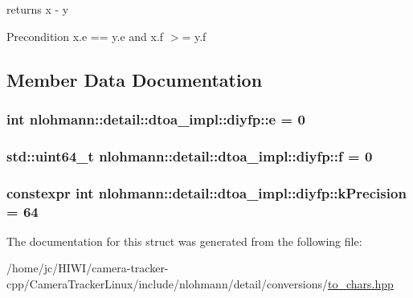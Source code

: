 returns x -\/ y 

\begin{DoxyPrecond}{Precondition}
x.\+e == y.\+e and x.\+f $>$= y.\+f 
\end{DoxyPrecond}


\subsection{Member Data Documentation}
\subsubsection[{\texorpdfstring{e}{e}}]{\setlength{\rightskip}{0pt plus 5cm}int nlohmann\+::detail\+::dtoa\+\_\+impl\+::diyfp\+::e = 0}\hypertarget{structnlohmann_1_1detail_1_1dtoa__impl_1_1diyfp_ae22e170815983961447c429f324c944d}{}\label{structnlohmann_1_1detail_1_1dtoa__impl_1_1diyfp_ae22e170815983961447c429f324c944d}
\subsubsection[{\texorpdfstring{f}{f}}]{\setlength{\rightskip}{0pt plus 5cm}std\+::uint64\+\_\+t nlohmann\+::detail\+::dtoa\+\_\+impl\+::diyfp\+::f = 0}\hypertarget{structnlohmann_1_1detail_1_1dtoa__impl_1_1diyfp_aea90459e340a231ca31d46946803ef51}{}\label{structnlohmann_1_1detail_1_1dtoa__impl_1_1diyfp_aea90459e340a231ca31d46946803ef51}
\subsubsection[{\texorpdfstring{k\+Precision}{kPrecision}}]{\setlength{\rightskip}{0pt plus 5cm}constexpr int nlohmann\+::detail\+::dtoa\+\_\+impl\+::diyfp\+::k\+Precision = 64\hspace{0.3cm}{\ttfamily [static]}}\hypertarget{structnlohmann_1_1detail_1_1dtoa__impl_1_1diyfp_a03682754b06ed4f30b263119eecc2d52}{}\label{structnlohmann_1_1detail_1_1dtoa__impl_1_1diyfp_a03682754b06ed4f30b263119eecc2d52}


The documentation for this struct was generated from the following file\+:\begin{DoxyCompactItemize}
\item 
/home/jc/\+H\+I\+W\+I/camera-\/tracker-\/cpp/\+Camera\+Tracker\+Linux/include/nlohmann/detail/conversions/\hyperlink{to__chars_8hpp}{to\+\_\+chars.\+hpp}\end{DoxyCompactItemize}
